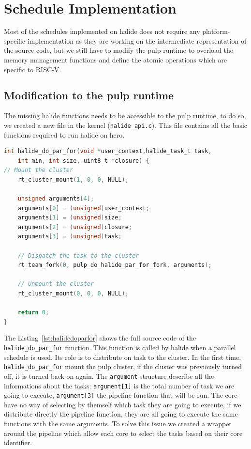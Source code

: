 \section{Schedule Implementation }
	Most of the schedules implemented on halide does not require any platform-specific implementation as they are working on the intermediate representation of the source code, but we still have to modify the \gls{pulp} runtime to overload the memory management functions and define the atomic operations which are specific to RISC-V.

    \subsection{Modification to the \acrshort{pulp} runtime}

    The missing halide functions needs to be accessible to the \gls{pulp} runtime, to do so, we created a new file in the kernel (\texttt{halide\_api.c}). 
    This file contains all the basic functions required to run halide on \gls{hero}.

\begin{lstlisting}[language=C,caption={The \texttt{halide\_do\_par\_for} function.},label={lst:halidedoparfor},captionpos=b]
int halide_do_par_for(void *user_context,halide_task_t task,
	int min, int size, uint8_t *closure) {
// Mount the cluster
	rt_cluster_mount(1, 0, 0, NULL);

	unsigned arguments[4];
	arguments[0] = (unsigned)user_context;
	arguments[1] = (unsigned)size;
	arguments[2] = (unsigned)closure;
	arguments[3] = (unsigned)task;

	// Dispatch the task to the cluster
	rt_team_fork(0, pulp_do_halide_par_for_fork, arguments);

	// Unmount the cluster
	rt_cluster_mount(0, 0, 0, NULL);

	return 0;
}
\end{lstlisting}

	The Listing~\ref{lst:halidedoparfor} shows the full source code of the \texttt{halide\_do\_par\_for} function.
	This function is called by halide when a parallel schedule is used. Its role is to distribute on task to the cluster.
	In the first time, \texttt{halide\_do\_par\_for} mount the \gls{pulp} cluster, if the cluster was previously turned off, it is turned back on again.
	The \texttt{argument} structure describe all the informations about the tasks: \texttt{argument[1]} is the total number of task we are going to execute, \texttt{argument[3]} the pipeline function that will be run.
	The core have no way of selecting by themself which task they are going to execute, if we distribute directly the pipeline function, they are all going to execute the same functions with the same arguments.
	To solve this issue we created a wrapper around the pipeline which allow each core to select the tasks based on their core identifier.

